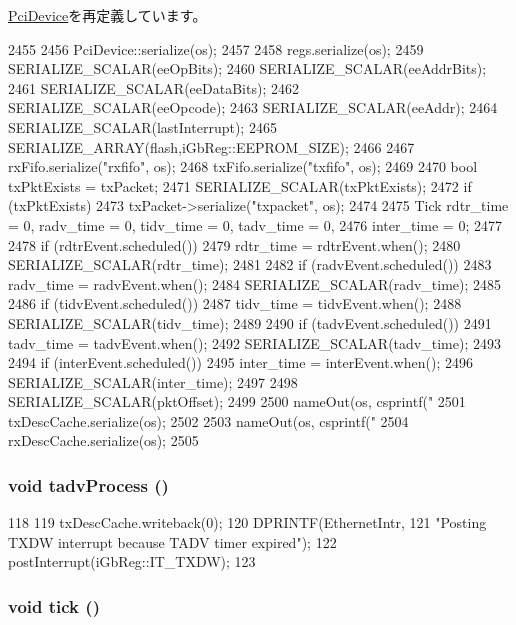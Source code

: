 \hyperlink{classPciDevice_a53e036786d17361be4c7320d39c99b84}{PciDevice}を再定義しています。


\begin{DoxyCode}
2455 {
2456     PciDevice::serialize(os);
2457 
2458     regs.serialize(os);
2459     SERIALIZE_SCALAR(eeOpBits);
2460     SERIALIZE_SCALAR(eeAddrBits);
2461     SERIALIZE_SCALAR(eeDataBits);
2462     SERIALIZE_SCALAR(eeOpcode);
2463     SERIALIZE_SCALAR(eeAddr);
2464     SERIALIZE_SCALAR(lastInterrupt);
2465     SERIALIZE_ARRAY(flash,iGbReg::EEPROM_SIZE);
2466 
2467     rxFifo.serialize("rxfifo", os);
2468     txFifo.serialize("txfifo", os);
2469 
2470     bool txPktExists = txPacket;
2471     SERIALIZE_SCALAR(txPktExists);
2472     if (txPktExists)
2473         txPacket->serialize("txpacket", os);
2474 
2475     Tick rdtr_time = 0, radv_time = 0, tidv_time = 0, tadv_time = 0,
2476         inter_time = 0;
2477 
2478     if (rdtrEvent.scheduled())
2479         rdtr_time = rdtrEvent.when();
2480     SERIALIZE_SCALAR(rdtr_time);
2481 
2482     if (radvEvent.scheduled())
2483         radv_time = radvEvent.when();
2484     SERIALIZE_SCALAR(radv_time);
2485 
2486     if (tidvEvent.scheduled())
2487         tidv_time = tidvEvent.when();
2488     SERIALIZE_SCALAR(tidv_time);
2489 
2490     if (tadvEvent.scheduled())
2491         tadv_time = tadvEvent.when();
2492     SERIALIZE_SCALAR(tadv_time);
2493 
2494     if (interEvent.scheduled())
2495         inter_time = interEvent.when();
2496     SERIALIZE_SCALAR(inter_time);
2497 
2498     SERIALIZE_SCALAR(pktOffset);
2499 
2500     nameOut(os, csprintf("%
2501     txDescCache.serialize(os);
2502 
2503     nameOut(os, csprintf("%
2504     rxDescCache.serialize(os);
2505 }
\end{DoxyCode}
\hypertarget{classIGbE_a7e3216d8f11c9d6c3fa244be21648778}{
\subsubsection[{tadvProcess}]{\setlength{\rightskip}{0pt plus 5cm}void tadvProcess ()}}
\label{classIGbE_a7e3216d8f11c9d6c3fa244be21648778}



\begin{DoxyCode}
118                        {
119         txDescCache.writeback(0);
120         DPRINTF(EthernetIntr,
121                 "Posting TXDW interrupt because TADV timer expired\n");
122         postInterrupt(iGbReg::IT_TXDW);
123     }
\end{DoxyCode}
\hypertarget{classIGbE_a873dd91783f9efb4a590aded1f70d6b0}{
\subsubsection[{tick}]{\setlength{\rightskip}{0pt plus 5cm}void tick ()}}
\label{classIGbE_a873dd91783f9efb4a590aded1f70d6b0}



